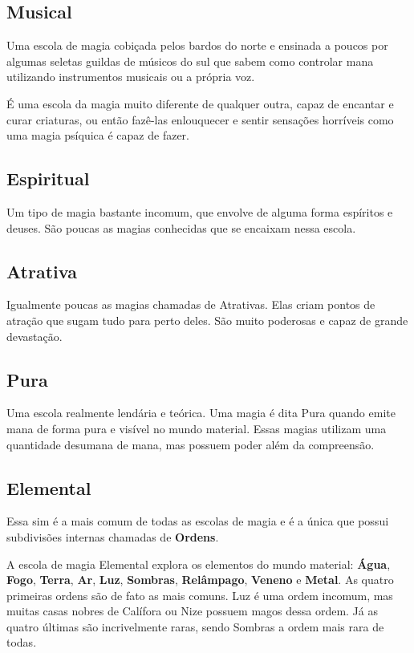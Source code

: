 \documentclass{RPG_Adventure}[2021/10/20]
\begin{document}
\subsection*{Musical}%
\label{sub:musical}

Uma escola de magia cobiçada pelos bardos do norte e ensinada a poucos por
algumas seletas guildas de músicos do sul que sabem como controlar mana
utilizando instrumentos musicais ou a própria voz.

É uma escola da magia muito diferente de qualquer outra, capaz de encantar e
curar criaturas, ou então fazê-las enlouquecer e sentir sensações horríveis como
uma magia psíquica é capaz de fazer.

\subsection*{Espiritual}%
\label{sub:espiritual}

Um tipo de magia bastante incomum, que envolve de alguma forma espíritos e
deuses. São poucas as magias conhecidas que se encaixam nessa escola.

\subsection*{Atrativa}%
\label{sub:atrativa}

Igualmente poucas as magias chamadas de Atrativas. Elas criam pontos de atração
que sugam tudo para perto deles. São muito poderosas e capaz de grande
devastação.

\subsection*{Pura}%
\label{sub:pura}

Uma escola realmente lendária e teórica. Uma magia é dita Pura quando emite mana
de forma pura e visível no mundo material. Essas magias utilizam uma quantidade
desumana de mana, mas possuem poder além da compreensão.

\subsection*{Elemental}%
\label{sub:elemental}

Essa sim é a mais comum de todas as escolas de magia e é a única que possui
subdivisões internas chamadas de \textbf{Ordens}.

A escola de magia Elemental explora os elementos do mundo material:
\textbf{Água}, \textbf{Fogo}, \textbf{Terra}, \textbf{Ar}, \textbf{Luz},
\textbf{Sombras}, \textbf{Relâmpago}, \textbf{Veneno} e \textbf{Metal}. As
quatro primeiras ordens são de fato as mais comuns. Luz é uma ordem incomum, mas
muitas casas nobres de Calífora ou Nize possuem magos dessa ordem. Já as quatro
últimas são incrivelmente raras, sendo Sombras a ordem mais rara de todas.
\end{document}
